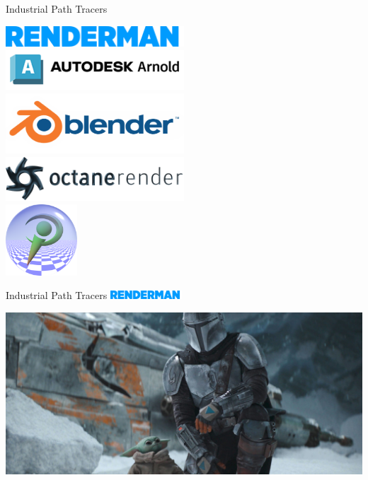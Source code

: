\documentclass{beamer}
\begin{document}
\begin{frame}{Industrial Path Tracers}
    \begin{center}
    \includegraphics[width=0.5\textwidth]{./renderman.png}\\
    \vspace{0.2cm}
    \includegraphics[width=0.5\textwidth]{./arnold.png}\\
    \includegraphics[width=0.5\textwidth]{./blender.png}\\
    \includegraphics[width=0.5\textwidth]{./octane.png}\\
    \includegraphics[width=0.2\textwidth]{./povray.png}
    \end{center}
\end{frame}

\begin{frame}{Industrial Path Tracers}
    \includegraphics[width=0.2\textwidth]{./renderman.png}
    \begin{center}
    \includegraphics[width=1.0\textwidth]{./renderman-2.png}
    \end{center}
\end{frame}
\end{document}
